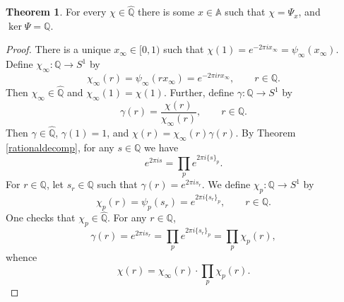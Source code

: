 \documentclass{article}
\theoremstyle{definition}
\newtheorem{theorem}{Theorem}
\theoremstyle{definition}
\begin{document}
\begin{theorem}
For every $\chi \in \widehat{\mathbb{Q}}$ there is some $x \in
\mathbb{A}$ such that $\chi=\Psi_x$, and $\ker \Psi=\mathbb{Q}$.
\end{theorem}
\begin{proof}
There is a unique $x_\infty \in [0,1)$ such that $\chi(1)=e^{-2\pi ix_\infty}=\psi_\infty(x_\infty)$. Define
$\chi_\infty:\mathbb{Q} \to S^1$ by
\[
\chi_\infty(r)=\psi_\infty(rx_\infty) = e^{-2\pi irx_\infty}, \qquad r \in \mathbb{Q}.
\]
Then $\chi_\infty \in \widehat{\mathbb{Q}}$ and $\chi_\infty(1)=\chi(1)$.  Further, define
$\gamma:\mathbb{Q} \to S^1$ by 
\[
\gamma(r) = \frac{\chi(r)}{\chi_\infty(r)}, \qquad r \in \mathbb{Q}.
\]
Then $\gamma \in \widehat{\mathbb{Q}}$, $\gamma(1)=1$,  and $\chi (r) = \chi_\infty(r) \gamma(r)$.
By
Theorem \ref{rationaldecomp}, for any $s \in \mathbb{Q}$ we have
\[
e^{2\pi is} = \prod_p e^{2\pi i\{s\}_p}.
\]
For $r \in \mathbb{Q}$, let $s_r \in \mathbb{Q}$ such that $\gamma(r) = e^{2\pi is_r}$. 
We define $\chi_p:\mathbb{Q} \to S^1$ by
\[
\chi_p(r) = \psi_p(s_r) = e^{2\pi i\{s_r\}_p}, \qquad r \in \mathbb{Q}.
\]
One checks that $\chi_p \in \widehat{\mathbb{Q}}$.
For any $r \in \mathbb{Q}$,
\[
\gamma(r)=e^{2\pi is_r} = \prod_p e^{2\pi i\{s_r\}_p} = 
\prod_p \chi_p(r),
\]
whence
\[
\chi(r) = \chi_\infty(r) \cdot \prod_p \chi_p(r).
\]


\end{proof}
\end{document}

